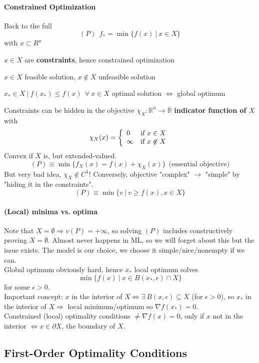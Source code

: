 \documentclass[10pt]{report}
\begin{document}
\paragraph{Constrained Optimization} Back to the full $$(P)\:\:f_* = \min\{f(x)\:|\:x\in X\}$$ with $x\subset R^n$\begin{list}{}{}
	\item $x\in X$ are \textbf{constraints}, hence constrained optimization
	\item $x\in X$ feasible solution, $x\not\in X$ unfeasible solution
	\item $x_*\in X\:|\:f(x_*)\leq f(x)\:\:\forall\:x\in X$ optimal solution $\Leftrightarrow$ global optimum
\end{list}
Constraints can be hidden in the objective $\chi_X : \mathbb{R}^n\rightarrow \overline{\mathbb{R}}$ \textbf{indicator function of $X$} with $$\chi_X(x)=\left\{\begin{array}{l l}
0&\text{if }x\in X\\
\infty&\text{if }x\not\in X
\end{array}\right.$$ Convex if $X$ is, but extended-valued.
$$(P)\equiv \min\{f_X(x)=f(x)+\chi_X(x)\}\:\:\text{(essential objective)}$$ But very bad idea, $\chi_X\not\in C^1$! Conversely, objective "complex" $\rightarrow$ "simple" by "hiding it in the constraints".
$$(P)\equiv\min\{v\:|\:v\geq f(x), x\in X\}$$
\paragraph{(Local) minima vs. optima} Note that $X=\emptyset\Rightarrow v(P) = +\infty$, so solving $(P)$ includes constructively proving $X=\emptyset$. Almost never happens in ML, so we will forget about this but the issue exists. The model is our choice, we choose it simple/nice/nonempty if we can.\\
Global optimum obviously hard, hence $x_*$ local optimum solves $$\min\{f(x)\:|\:x\in B(x_*,\epsilon)\cap X\}$$ for some $\epsilon>0$.\\
Important concept: $x$ in the interior of $X\Leftrightarrow\exists\:B(x,\epsilon)\subseteq X$ (for $\epsilon>0$), so $x_*$ in the interior of $X\Rightarrow$ local minimum/optimum so $\nabla f(x_*)=0$.\\
Constrained (local) optimality conditions $\neq\nabla f(x)=0$, only if $x$ not in the interior $\Leftrightarrow x\in \partial X$, the boundary of $X$.
\subsection{First-Order Optimality Conditions}
\end{document}
